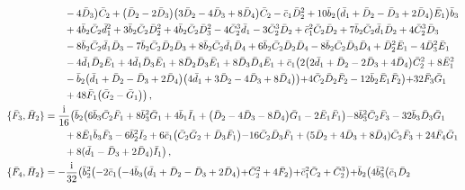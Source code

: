 \documentclass[10pt]{amsart}
\theoremstyle{definition}
\theoremstyle{corollary}
\theoremstyle{remark}
\theoremstyle{conclusion}
\begin{document}
\begin{align}
& \hskip 0.7cm - 4 \bar{D}_3\bigl) \bar{C}_2+\bigl(\bar{D}_2-2 \bar{D}_3\bigl) \bigl(3 \bar{D}_2-4 \bar{D}_3+8 \bar{D}_4\bigl) \bar{C}_2-\bar{c}_1 \bar{D}_2^2+10 \bar{b}_2 \bigl(\bar{d}_1+\bar{D}_2-\bar{D}_3+2 \bar{D}_4\bigl) \bar{E}_1\bigl) \bar{b}_3  \nonumber\\
& \hskip 0.7cm +4 \bar{b}_2 \bar{C}_2 \bar{d}_1^2+3 \bar{b}_2 \bar{C}_2 \bar{D}_2^2+4 \bar{b}_2 \bar{C}_2 \bar{D}_3^2-4 \bar{C}_2^3 \bar{d}_1-3 \bar{C}_2^3 \bar{D}_2+\bar{c}_1^2 \bar{C}_2 \bar{D}_2+7 \bar{b}_2 \bar{C}_2 \bar{d}_1 \bar{D}_2+4 \bar{C}_2^3 \bar{D}_3 \nonumber\\
& \hskip 0.7cm -8 \bar{b}_2 \bar{C}_2 \bar{d}_1 \bar{D}_3-7 \bar{b}_2 \bar{C}_2 \bar{D}_2 \bar{D}_3+8 \bar{b}_2 \bar{C}_2 \bar{d}_1 \bar{D}_4+6 \bar{b}_2 \bar{C}_2 \bar{D}_2 \bar{D}_4-8 \bar{b}_2 \bar{C}_2 \bar{D}_3 \bar{D}_4+\bar{D}_2^2 \bar{E}_1-4 \bar{D}_3^2 \bar{E}_1 \nonumber\\
& \hskip 0.7cm -4 \bar{d}_1 \bar{D}_2 \bar{E}_1+4 \bar{d}_1 \bar{D}_3 \bar{E}_1+8 \bar{D}_2 \bar{D}_3 \bar{E}_1+8 \bar{D}_3 \bar{D}_4 \bar{E}_1+\bar{c}_1 \bigl(2 \bigl(2 \bar{d}_1+\bar{D}_2-2 \bar{D}_3+4 \bar{D}_4\bigl) \bar{C}_2^2+8 \bar{E}_1^2  \nonumber\\
& \hskip 0.7cm -\bar{b}_2 \bigl(\bar{d}_1+\bar{D}_2-\bar{D}_3+2 \bar{D}_4\bigl) \bigl(4 \bar{d}_1+3 \bar{D}_2-4 \bar{D}_3+8 \bar{D}_4\bigl)\bigl)+4 \bar{C}_2 \bar{D}_2 \bar{F}_2-12 \bar{b}_2 \bar{E}_1 \bar{F}_2\bigl)+32 \bar{F}_3 \bar{G}_1  \nonumber\\
& \hskip 0.7cm +48 \bar{F}_1 \bigl(\bar{G}_2-\bar{G}_1\bigl)\bigl) \, , \nonumber \\
\{\bar{F}_3, \bar{H}_2\}&=\frac{\rm i}{16}   \bigl(\bar{b}_2 \bigl(6 \bar{b}_3 \bar{C}_2 \bar{F}_1+8 \bar{b}_3^2 \bar{G}_1+4 \bar{b}_1 \bar{I}_1+\bigl(\bar{D}_2-4 \bar{D}_3-8 \bar{D}_4\bigl) \bar{G}_1-2 \bar{E}_1 \bar{F}_1\bigl)-8 \bar{b}_3^2 \bar{C}_2 \bar{F}_3-32 \bar{b}_3 \bar{D}_3 \bar{G}_1  \nonumber\\
& \hskip 0.7cm+8 \bar{E}_1 \bar{b}_3 \bar{F}_3-6 \bar{b}_2^2 \bar{I}_2+6 \bar{c}_1 \bigl(\bar{C}_2 \bar{G}_2+\bar{D}_3 \bar{F}_1\bigl)-16 \bar{C}_2 \bar{D}_3 \bar{F}_1+(5 \bar{D}_2 +4  \bar{D}_3+8 \bar{D}_4) \bar{C}_2\bar{F}_3+24 \bar{F}_4 \bar{G}_1  \nonumber\\
& \hskip 0.7cm+8 (\bar{d}_1- \bar{D}_3 +2 \bar{D}_4) \bar{I}_1\bigl) \, ,  \nonumber\\
\{\bar{F}_4, \bar{H}_2\}&=-\frac{\rm i}{32}  \bigl(\bar{b}_2^2 \bigl(-2 \bar{c}_1 \bigl(-4 \bar{b}_3 \bigl(\bar{d}_1+\bar{D}_2-\bar{D}_3+2 \bar{D}_4\bigl)+\bar{C}_2^2+4 \bar{F}_2\bigl)+\bar{c}_1^2 \bar{C}_2+\bar{C}_2^3\bigl)+\bar{b}_2 \bigl(4 \bar{b}_3^2 \bigl(\bar{c}_1 \bar{D}_2  \nonumber\\

\end{align}
\end{document}

